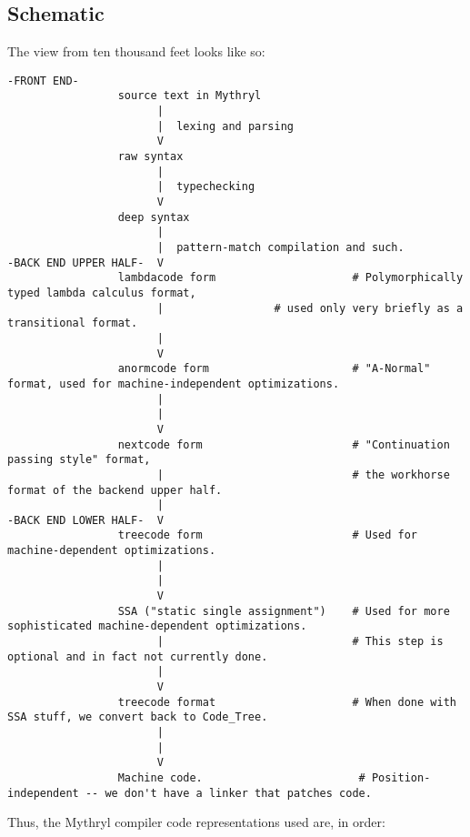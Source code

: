 
\subsection{Schematic}
\label{section:compiler:schematic}

The view from ten thousand feet looks like so: 

\begin{verbatim}
-FRONT END-
                 source text in Mythryl
                       |
                       |  lexing and parsing
                       V
                 raw syntax
                       |
                       |  typechecking
                       V
                 deep syntax
                       |
                       |  pattern-match compilation and such.
-BACK END UPPER HALF-  V
                 lambdacode form                     # Polymorphically typed lambda calculus format,
                       |			     # used only very briefly as a transitional format.	
                       |  
                       V
                 anormcode form                      # "A-Normal" format, used for machine-independent optimizations.
                       |
                       |
                       V
                 nextcode form                       # "Continuation passing style" format,
                       |                             # the workhorse format of the backend upper half.
                       |
-BACK END LOWER HALF-  V
                 treecode form                       # Used for machine-dependent optimizations.
                       |
                       |
                       V
                 SSA ("static single assignment")    # Used for more sophisticated machine-dependent optimizations.
                       |                             # This step is optional and in fact not currently done.
                       |
                       V
                 treecode format                     # When done with SSA stuff, we convert back to Code_Tree.
                       |
                       |
                       V
                 Machine code.                        # Position-independent -- we don't have a linker that patches code.
\end{verbatim}

Thus, the Mythryl compiler code representations used are, in order:

